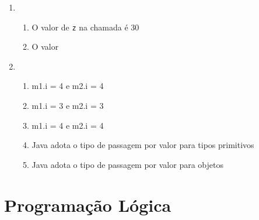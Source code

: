 \documentclass{article}
\begin{document}
\begin{enumerate}
    \item
          \begin{enumerate}[label = (\alph*)]
              \item
                    O valor de \texttt{z} na chamada é 30
              \item
                    O valor
          \end{enumerate}
    \item
          \begin{enumerate}[label = (\alph*)]
              \item
                    m1.i = 4 e m2.i = 4
              \item
                    m1.i = 3 e m2.i = 3
              \item
                    m1.i = 4 e m2.i = 4
              \item
                    Java adota o tipo de passagem por valor para tipos
                    primitivos
              \item
                    Java adota o tipo de passagem por valor para objetos
          \end{enumerate}

\end{enumerate}

\newpage

\section{Programação Lógica}
\end{document}
